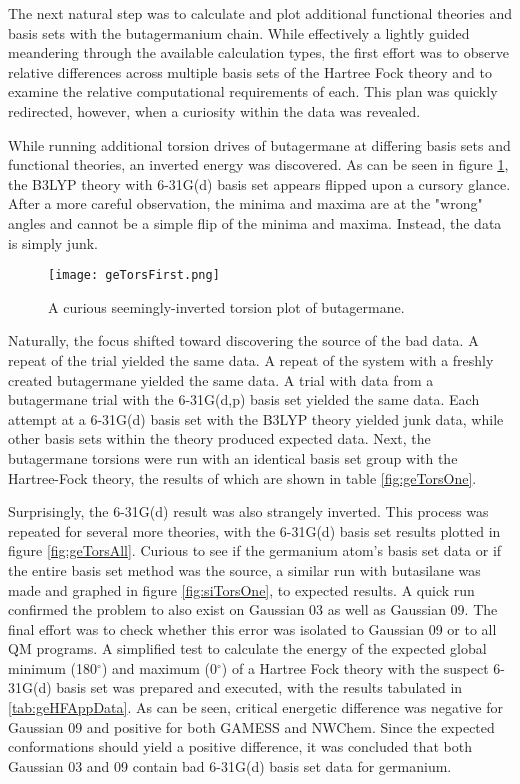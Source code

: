 The next natural step was to calculate and plot additional functional theories and basis sets with the butagermanium chain. 
While effectively a lightly guided meandering through the available calculation types, the first effort was to observe relative differences across multiple basis sets of the Hartree Fock theory and to examine the relative computational requirements of each.
This plan was quickly redirected, however, when a curiosity within the data was revealed.

While running additional torsion drives of butagermane at differing basis sets and functional theories, an inverted energy was discovered. 
As can be seen in figure \ref{fig:geTorsFirst}, the B3LYP theory with 6-31G(d) basis set appears flipped upon a cursory glance. 
After a more careful observation, the minima and maxima are at the "wrong" angles and cannot be a simple flip of the minima and maxima.
Instead, the data is simply junk.

\begin{figure}
	
	\centering
	
	\texttt{[image: geTorsFirst.png]}
	
	\caption{A curious seemingly-inverted torsion plot of butagermane.}
	
	\label{fig:geTorsFirst}
	
\end{figure}

Naturally, the focus shifted toward discovering the source of the bad data.
A repeat of the trial yielded the same data.
A repeat of the system with a freshly created butagermane yielded the same data.
A trial with data from a butagermane trial with the 6-31G(d,p) basis set yielded the same data.
Each attempt at a 6-31G(d) basis set with the B3LYP theory yielded junk data, while other basis sets within the theory produced expected data. 
Next, the butagermane torsions were run with an identical basis set group with the Hartree-Fock theory, the results of which are shown in table \ref{fig:geTorsOne}.

Surprisingly, the 6-31G(d) result was also strangely inverted.
This process was repeated for several more theories, with the 6-31G(d) basis set results plotted in figure \ref{fig:geTorsAll}.
Curious to see if the germanium atom's basis set data or if the entire basis set method was the source, a similar run with butasilane was made and graphed in figure \ref{fig:siTorsOne}, to expected results.
A quick run confirmed the problem to also exist on Gaussian 03 as well as Gaussian 09.
The final effort was to check whether this error was isolated to Gaussian 09 or to all QM programs. 
A simplified test to calculate the energy of the expected global minimum (180$^{\circ}$) and maximum (0$^{\circ}$) of a Hartree Fock theory with the suspect 6-31G(d) basis set was prepared and executed, with the results tabulated in \ref{tab:geHFAppData}.
As can be seen, critical energetic difference was negative for Gaussian 09 and positive for both GAMESS and NWChem.
Since the expected conformations should yield a positive difference, it was concluded that both Gaussian 03 and 09 contain bad 6-31G(d) basis set data for germanium.

